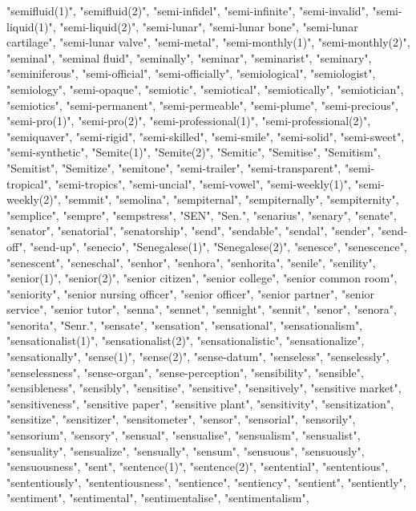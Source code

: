 "semifluid(1)",
"semifluid(2)",
"semi-infidel",
"semi-infinite",
"semi-invalid",
"semi-liquid(1)",
"semi-liquid(2)",
"semi-lunar",
"semi-lunar bone",
"semi-lunar cartilage",
"semi-lunar valve",
"semi-metal",
"semi-monthly(1)",
"semi-monthly(2)",
"seminal",
"seminal fluid",
"seminally",
"seminar",
"seminarist",
"seminary",
"seminiferous",
"semi-official",
"semi-officially",
"semiological",
"semiologist",
"semiology",
"semi-opaque",
"semiotic",
"semiotical",
"semiotically",
"semiotician",
"semiotics",
"semi-permanent",
"semi-permeable",
"semi-plume",
"semi-precious",
"semi-pro(1)",
"semi-pro(2)",
"semi-professional(1)",
"semi-professional(2)",
"semiquaver",
"semi-rigid",
"semi-skilled",
"semi-smile",
"semi-solid",
"semi-sweet",
"semi-synthetic",
"Semite(1)",
"Semite(2)",
"Semitic",
"Semitise",
"Semitism",
"Semitist",
"Semitize",
"semitone",
"semi-trailer",
"semi-transparent",
"semi-tropical",
"semi-tropics",
"semi-uncial",
"semi-vowel",
"semi-weekly(1)",
"semi-weekly(2)",
"semmit",
"semolina",
"sempiternal",
"sempiternally",
"sempiternity",
"semplice",
"sempre",
"sempstress",
"SEN",
"Sen.",
"senarius",
"senary",
"senate",
"senator",
"senatorial",
"senatorship",
"send",
"sendable",
"sendal",
"sender",
"send-off",
"send-up",
"senecio",
"Senegalese(1)",
"Senegalese(2)",
"senesce",
"senescence",
"senescent",
"seneschal",
"senhor",
"senhora",
"senhorita",
"senile",
"senility",
"senior(1)",
"senior(2)",
"senior citizen",
"senior college",
"senior common room",
"seniority",
"senior nursing officer",
"senior officer",
"senior partner",
"senior service",
"senior tutor",
"senna",
"sennet",
"sennight",
"sennit",
"senor",
"senora",
"senorita",
"Senr.",
"sensate",
"sensation",
"sensational",
"sensationalism",
"sensationalist(1)",
"sensationalist(2)",
"sensationalistic",
"sensationalize",
"sensationally",
"sense(1)",
"sense(2)",
"sense-datum",
"senseless",
"senselessly",
"senselessness",
"sense-organ",
"sense-perception",
"sensibility",
"sensible",
"sensibleness",
"sensibly",
"sensitise",
"sensitive",
"sensitively",
"sensitive market",
"sensitiveness",
"sensitive paper",
"sensitive plant",
"sensitivity",
"sensitization",
"sensitize",
"sensitizer",
"sensitometer",
"sensor",
"sensorial",
"sensorily",
"sensorium",
"sensory",
"sensual",
"sensualise",
"sensualism",
"sensualist",
"sensuality",
"sensualize",
"sensually",
"sensum",
"sensuous",
"sensuously",
"sensuousness",
"sent",
"sentence(1)",
"sentence(2)",
"sentential",
"sententious",
"sententiously",
"sententiousness",
"sentience",
"sentiency",
"sentient",
"sentiently",
"sentiment",
"sentimental",
"sentimentalise",
"sentimentalism",
